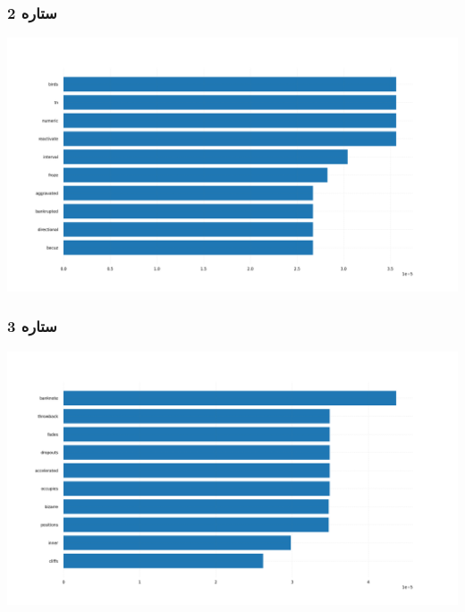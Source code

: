 \subsubsection{\Large 2 ستاره}
{ \selectfont \setLR
\begin{center}
\includegraphics[scale=0.4]{Images/tf_idf_2.png}
\end{center}
\begin{adjustbox}{width=\textwidth}
\end{adjustbox}
}
\subsubsection{\Large 3 ستاره}
{ \selectfont \setLR
\begin{center}
\includegraphics[scale=0.4]{Images/tf_idf_3.png}
\end{center}
\begin{adjustbox}{width=\textwidth}
\end{adjustbox}
}
